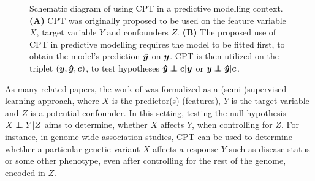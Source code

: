 \documentclass{article}
\begin{document}
\begin{figure}
{

    }
  \caption{Schematic diagram of using CPT in a predictive modelling context. \\ \textbf{(A)} CPT was originally proposed to be used on the feature variable $X$, target variable $Y$ and confounders $Z$. \textbf{(B)} The proposed use of CPT in predictive modelling requires the model to be fitted first, to obtain the model's prediction $\boldsymbol{\hat{y}}$ on $\boldsymbol{y}$. CPT is then utilized on the triplet $(\boldsymbol{y}, \boldsymbol{\hat{y}}, \boldsymbol{c})$, to test hypotheses $\yhat \independent \c | \y$ or $\y \independent \yhat | \c$.}
  \label{fig:schematic}
\end{figure}


As many related papers, the work of \cite{berrett2020conditional} was formalized as a (semi-)supervised learning approach, where $X$ is the predictor(s) (features), $Y$ is the target variable and $Z$ is a potential confounder. In this setting, testing the null hypothesis $X \independent Y | Z$ aims to determine, whether $X$ affects $Y$, when controlling for $Z$.
For instance, in genome-wide association studies, CPT can be used to determine whether a particular genetic variant $X$ affects a response $Y$ such as disease status or some other phenotype, even after controlling for the rest of the genome, encoded in $Z$.
\end{document}
